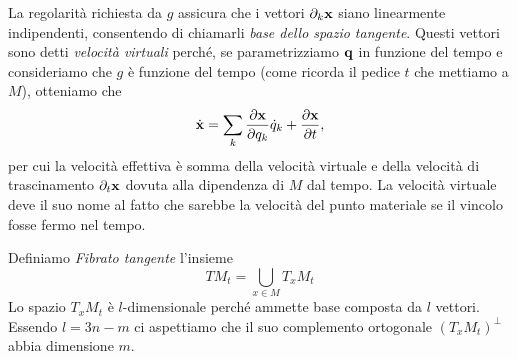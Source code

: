    La regolarità richiesta da $g$ assicura che i vettori $\partial_k \mathbf{x}$ siano linearmente indipendenti, consentendo di chiamarli \emph{base dello spazio tangente}. Questi vettori sono detti \emph{velocità virtuali} perché, se parametrizziamo $\mathbf{q}$ in funzione del tempo e consideriamo che $g$ è funzione del tempo (come ricorda il pedice $t$ che mettiamo a $M$), otteniamo che 
    \begin{equation}
        \dot{\mathbf{x}} = \sum_k \frac{\partial \mathbf{x}}{\partial q_k} \dot{q}_k + \frac{\partial \mathbf{x}}{\partial t},
    \end{equation}
    per cui la velocità effettiva è somma della velocità virtuale e della velocità di trascinamento $\partial_t \mathbf{x}$ dovuta alla dipendenza di $M$ dal tempo. La velocità virtuale deve il suo nome al fatto che sarebbe la velocità del punto materiale se il vincolo fosse fermo nel tempo.
    
    Definiamo \emph{Fibrato tangente} l'insieme
    \begin{equation}
        TM_t = \bigcup_{x\in M} T_x M_t
    \end{equation}
    Lo spazio $T_xM_t$ è $l$-dimensionale perché ammette base composta da $l$ vettori. Essendo $l=3n-m$ ci aspettiamo che il suo complemento ortogonale $(T_xM_t)^\perp$ abbia dimensione $m$. 

